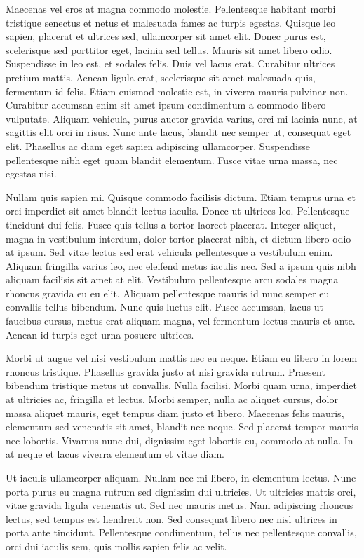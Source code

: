 \documentclass[a4paper]{article}
\begin{document}
Maecenas vel eros at magna commodo molestie. Pellentesque habitant morbi tristique senectus et netus et malesuada fames ac turpis egestas. Quisque leo sapien, placerat et ultrices sed, ullamcorper sit amet elit. Donec purus est, scelerisque sed porttitor eget, lacinia sed tellus. Mauris sit amet libero odio. Suspendisse in leo est, et sodales felis. Duis vel lacus erat. Curabitur ultrices pretium mattis. Aenean ligula erat, scelerisque sit amet malesuada quis, fermentum id felis. Etiam euismod molestie est, in viverra mauris pulvinar non. Curabitur accumsan enim sit amet ipsum condimentum a commodo libero vulputate. Aliquam vehicula, purus auctor gravida varius, orci mi lacinia nunc, at sagittis elit orci in risus. Nunc ante lacus, blandit nec semper ut, consequat eget elit. Phasellus ac diam eget sapien adipiscing ullamcorper. Suspendisse pellentesque nibh eget quam blandit elementum. Fusce vitae urna massa, nec egestas nisi.

Nullam quis sapien mi. Quisque commodo facilisis dictum. Etiam tempus urna et orci imperdiet sit amet blandit lectus iaculis. Donec ut ultrices leo. Pellentesque tincidunt dui felis. Fusce quis tellus a tortor laoreet placerat. Integer aliquet, magna in vestibulum interdum, dolor tortor placerat nibh, et dictum libero odio at ipsum. Sed vitae lectus sed erat vehicula pellentesque a vestibulum enim. Aliquam fringilla varius leo, nec eleifend metus iaculis nec. Sed a ipsum quis nibh aliquam facilisis sit amet at elit. Vestibulum pellentesque arcu sodales magna rhoncus gravida eu eu elit. Aliquam pellentesque mauris id nunc semper eu convallis tellus bibendum. Nunc quis luctus elit. Fusce accumsan, lacus ut faucibus cursus, metus erat aliquam magna, vel fermentum lectus mauris et ante. Aenean id turpis eget urna posuere ultrices.

Morbi ut augue vel nisi vestibulum mattis nec eu neque. Etiam eu libero in lorem rhoncus tristique. Phasellus gravida justo at nisi gravida rutrum. Praesent bibendum tristique metus ut convallis. Nulla facilisi. Morbi quam urna, imperdiet at ultricies ac, fringilla et lectus. Morbi semper, nulla ac aliquet cursus, dolor massa aliquet mauris, eget tempus diam justo et libero. Maecenas felis mauris, elementum sed venenatis sit amet, blandit nec neque. Sed placerat tempor mauris nec lobortis. Vivamus nunc dui, dignissim eget lobortis eu, commodo at nulla. In at neque et lacus viverra elementum et vitae diam.

Ut iaculis ullamcorper aliquam. Nullam nec mi libero, in elementum lectus. Nunc porta purus eu magna rutrum sed dignissim dui ultricies. Ut ultricies mattis orci, vitae gravida ligula venenatis ut. Sed nec mauris metus. Nam adipiscing rhoncus lectus, sed tempus est hendrerit non. Sed consequat libero nec nisl ultrices in porta ante tincidunt. Pellentesque condimentum, tellus nec pellentesque convallis, orci dui iaculis sem, quis mollis sapien felis ac velit.
\end{document}
